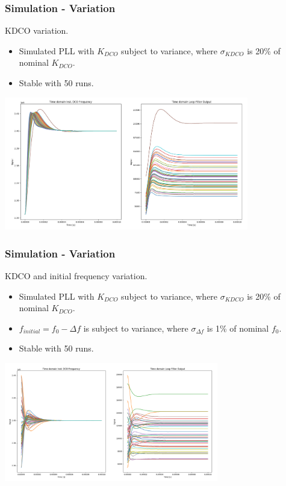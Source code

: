 \documentclass[t, screen, aspectratio=43]{beamer}
\begin{document}
\begin{frame}
	\frametitle{Simulation - Variation}
	\begin{block}{KDCO variation.}
			\scriptsize
		\begin{itemize}
			\item Simulated PLL with $K_{DCO}$ subject to variance, where $\sigma_{KDCO}$ is 20\% of nominal $K_{DCO}$.
			\item Stable with 50 runs.
		\end{itemize}
			\center\includegraphics[width=0.8\textwidth, angle=0]{kdco_sweep.png}
	\end{block}
\end{frame}


\begin{frame}
	\frametitle{Simulation - Variation}
	\begin{block}{KDCO and initial frequency variation.}
			\scriptsize
		\begin{itemize}
			\item Simulated PLL with $K_{DCO}$ subject to variance, where $\sigma_{KDCO}$ is 20\% of nominal $K_{DCO}$.
			\item $f_{initial} = f_0 - \Delta f$ is subject to variance, where $\sigma_{\Delta f}$ is 1\% of nominal $f_0$.
			\item Stable with 50 runs.
		\end{itemize}
			\center\includegraphics[width=0.7\textwidth, angle=0]{kdco_var_fstart_var.png}
	\end{block}
\end{frame}
\end{document}
